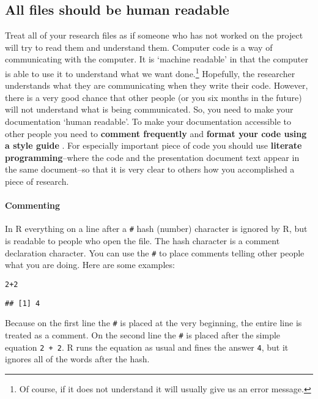 \subsection{All files should be human readable}

Treat all of your research files as if someone who has not worked on the project will try to read them and understand them. Computer code is a way of communicating with the computer. It is `machine readable' in that the computer is able to use it to understand what we want done.\footnote{Of course, if it does not understand it will usually give us an error message.} Hopefully, the researcher understands what they are communicating when they write their code. However, there is a very good chance that other people (or you six months in the future) will not understand what is being communicated. So, you need to make your documentation `human readable'. To make your documentation accessible to other people you need to {\bf{comment frequently}} \cite[3]{Bowers2011} and {\bf{format your code using a style guide}} \cite[]{Nagler1995}. For especially important piece of code you should use {\bf{literate programming}}--where the code and the presentation document text appear in the same document--so that it is very clear to others how you accomplished a piece of research.

\paragraph{Commenting}
In R everything on a line after a {\tt{\#}} hash (number) character is ignored by R, but is readable to people who open the file. The hash character is a comment declaration character. You can use the {\tt{\#}} to place comments telling other people what you are doing. Here are some examples:

\begin{knitrout}
\color{fgcolor}\begin{kframe}
\begin{alltt}
2 + 2  
\end{alltt}
\begin{verbatim}
## [1] 4
\end{verbatim}
\end{kframe}
\end{knitrout}


Because on the first line the {\tt{\#}} is placed at the very beginning, the entire line is treated as a comment. On the second line the {\tt{\#}} is placed after the simple equation {\tt{2 + 2}}. R runs the equation as usual and fines the answer {\tt{4}}, but it ignores all of the words after the hash. 


